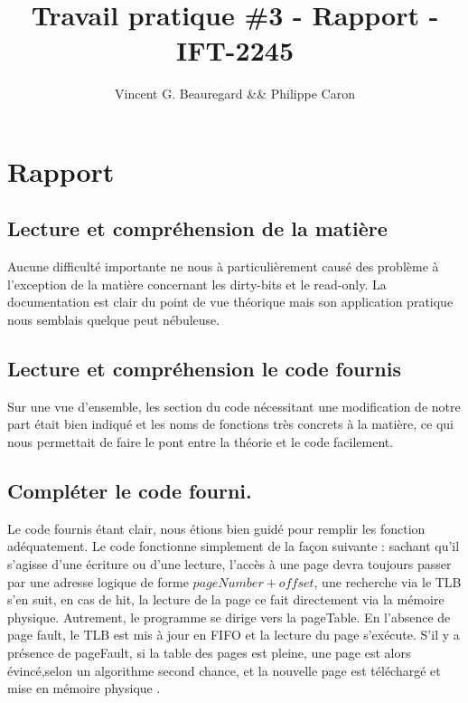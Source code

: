 \documentclass{article}
\title{Travail pratique \#3 - Rapport - IFT-2245}
\author{Vincent G. Beauregard \&\& Philippe Caron}
\begin{document}
	\maketitle
	\newpage

\section*{Rapport}
\subsection*{Lecture et compréhension de la matière}

Aucune difficulté importante ne nous à particulièrement causé des problème à l'exception de la matière concernant les dirty-bits et le read-only. La documentation est clair du point de vue théorique mais son application pratique nous semblais quelque peut nébuleuse.

\subsection*{Lecture et compréhension le code fournis}
Sur une vue d'ensemble, les section du code nécessitant une modification de notre part était bien indiqué et les noms de fonctions très concrets à la matière, ce qui nous permettait de faire le pont entre la théorie et le code facilement.




\subsection*{Compléter le code fourni.}

Le code fournis étant clair, nous étions bien guidé pour remplir les fonction adéquatement. Le code fonctionne simplement de la façon suivante : sachant qu'il s'agisse d'une écriture ou d'une lecture, l'accès à une page devra toujours passer par une adresse logique de forme $pageNumber + offset$, une recherche via le TLB s'en suit, en cas de hit, la lecture de la page ce fait directement via la mémoire physique. Autrement, le programme se dirige vers la pageTable. En l'absence de page fault, le TLB est mis à jour en FIFO et la lecture du page s'exécute. S'il y a présence de pageFault, si la table des pages est pleine, une page est alors évincé,selon un algorithme second chance, et la nouvelle page est téléchargé et mise en mémoire physique . 
\end{document}
